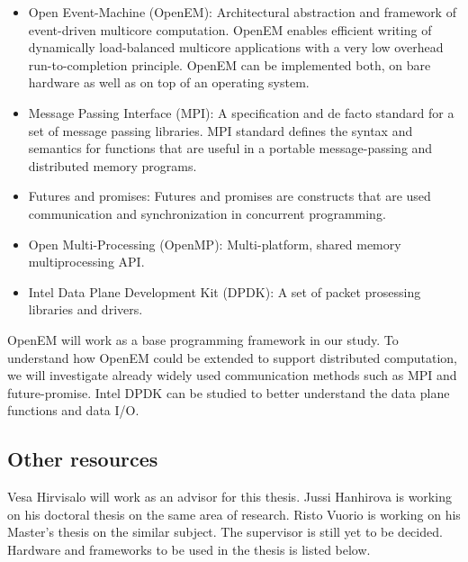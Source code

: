 \begin{itemize}

\item Open Event-Machine (OpenEM): Architectural abstraction and framework of event-driven multicore computation. OpenEM enables efficient writing of dynamically load-balanced multicore applications with a very low overhead run-to-completion principle. OpenEM can be implemented both, on bare hardware as well as on top of an operating system.
\item Message Passing Interface (MPI): A specification and de facto standard for a set of message passing libraries. MPI standard defines the syntax and semantics for functions that are useful in a portable message-passing and distributed memory programs.
\item Futures and promises: Futures and promises are constructs that are used communication and synchronization in concurrent programming.
\item Open Multi-Processing (OpenMP): Multi-platform, shared memory multiprocessing API.
\item Intel Data Plane Development Kit (DPDK): A set of packet prosessing libraries and drivers.
\end{itemize}

OpenEM will work as a base programming framework in our study. To understand how OpenEM could be extended to support distributed computation, we will investigate already widely used communication methods such as MPI and future-promise. Intel DPDK can be studied to better understand the data plane functions and data I/O.

\subsection{Other resources}
Vesa Hirvisalo will work as an advisor for this thesis. Jussi Hanhirova is working on his doctoral thesis on the same area of research. Risto Vuorio is working on his Master's thesis on the similar subject. The supervisor is still yet to be decided. Hardware and frameworks to be used in the thesis is listed below.



